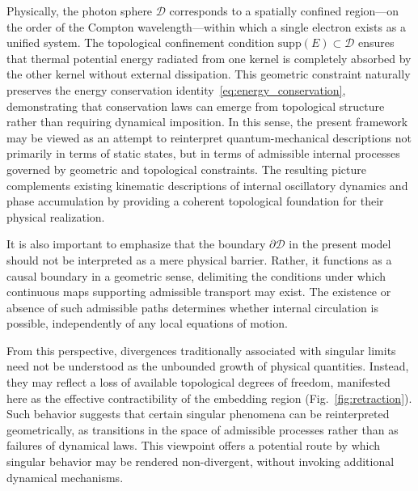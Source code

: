 \documentclass[%
 reprint,
 amsmath,amssymb,
 aps,
 prb,
]{revtex4-2}
\numberwithin{equation}{section}
\begin{document}
Physically, the photon sphere $\mathcal{D}$ corresponds to a spatially confined region—on the order of the Compton wavelength—within which a single electron exists as a unified system.
The topological confinement condition $\mathrm{supp}(E) \subset \mathcal{D}$ ensures that thermal potential energy radiated from one kernel is completely absorbed by the other kernel without external dissipation.
This geometric constraint naturally preserves the energy conservation identity~\eqref{eq:energy_conservation}, demonstrating that conservation laws can emerge from topological structure rather than requiring dynamical imposition.
In this sense, the present framework may be viewed as an attempt to reinterpret quantum-mechanical descriptions not primarily in terms of static states, but in terms of admissible internal processes governed by geometric and topological constraints.
The resulting picture complements existing kinematic descriptions of internal oscillatory dynamics and phase accumulation by providing a coherent topological foundation for their physical realization.

It is also important to emphasize that the boundary $\partial \mathcal{D}$ in the present model should not be interpreted as a mere physical barrier.
Rather, it functions as a causal boundary in a geometric sense, delimiting the conditions under which continuous maps supporting admissible transport may exist.
The existence or absence of such admissible paths determines whether internal circulation is possible, independently of any local equations of motion.

From this perspective, divergences traditionally associated with singular limits need not be understood as the unbounded growth of physical quantities.
Instead, they may reflect a loss of available topological degrees of freedom, manifested here as the effective contractibility of the embedding region (Fig.~\ref{fig:retraction}).
Such behavior suggests that certain singular phenomena can be reinterpreted geometrically, as transitions in the space of admissible processes rather than as failures of dynamical laws.
This viewpoint offers a potential route by which singular behavior may be rendered non-divergent, without invoking additional dynamical mechanisms.

\clearpage

\end{document}

